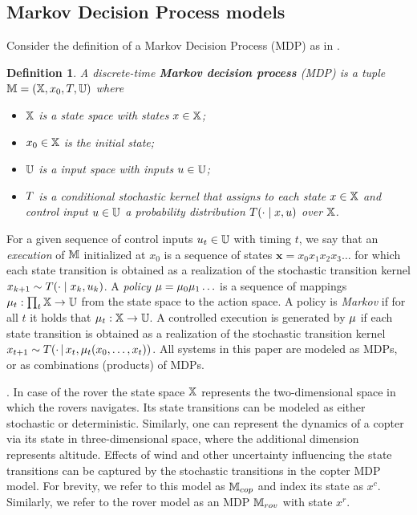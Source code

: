 \documentclass[conference]{IEEEtran}
\renewcommand{\cite}[1]{\citep{#1}}
\newtheorem{definition}{Definition}
\begin{document}
\subsection{Markov Decision Process models}
Consider the definition of a Markov Decision Process (MDP) as in \cite{Bertsekas1978}.
\begin{definition}
\label{def:MDP}
  A discrete-time \textbf{Markov decision process} (MDP) is a tuple $\mathbb{M} = (\mathbb{X}, x_0,T, \mathbb{U})$ where
  \begin{itemize}
    \item $\mathbb{X}$ is a state space with states $x\in\mathbb{X}$; %
    \item $x_0\in \mathbb{X}$ is the initial state;
    \item $\mathbb{U}$ is a input space with inputs $u\in\mathbb{U}$;
    \item $T$ is a conditional stochastic kernel that assigns to each state $x\in \mathbb{X}$ and control input $u\in \mathbb{U}$ a probability distribution $T(\cdot\mid x,u)$ over $\mathbb{X}$.
  \end{itemize}
\end{definition}
For a given sequence of control inputs $u_t \in \mathbb{U}$ with timing $t$, we say that an \emph{execution} of $\mathbb{M}$ initialized at $x_0$ is a sequence of states $\mathbf x = x_0x_1x_2x_3\ldots $ for which each state transition is obtained as a realization of the stochastic transition kernel $x_{k+1} \sim T(\cdot \mid x_k, u_k)$.
A \emph{policy} $\mu = \mu_0 \mu_1 \ldots$ is a sequence of mappings $\mu_t:\prod_{t}\mathbb{X}\rightarrow \mathbb{U}$ from the state space to the action space.  A policy is \emph{Markov}  if for all $t$ it holds that  $\mu_t:\mathbb{X}\rightarrow \mathbb{U}$. A controlled execution is generated by $\mu$ if each state transition is obtained as a realization of the stochastic transition kernel $x_{t+1} \sim T(\cdot\,{ \mid}\, x_t, \mu_t(x_0,\ldots,x_t))$. All systems in this paper are modeled as MDPs, or as combinations (products) of MDPs.

\smallskip
{}.
In case of the rover the state space $\mathbb{X}$ represents the two-dimensional space in which the rovers navigates. Its state transitions can be modeled as either stochastic or deterministic. Similarly, one can represent the dynamics of a copter via its state in three-dimensional space, where the additional dimension represents altitude. Effects of wind and other uncertainty influencing the state transitions can be captured by the stochastic transitions in the copter MDP model. For brevity, we refer to this model as $\mathbb{M}_{cop}$ and index its state as $x^c$. Similarly, we refer to the rover model as an MDP $\mathbb{M}_{rov}$ with state $x^r$.
\end{document}
